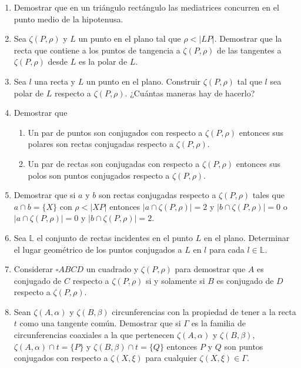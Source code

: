 \documentclass[12pt]{report}
\numberwithin{section}{chapter}
\begin{document}
\begin{enumerate}

\item Demostrar que en un triángulo rectángulo las mediatrices concurren en el punto medio de la hipotenusa.

\item Sea $\zeta(P, \rho)$ y $L$ un punto en el plano tal que $\rho < |LP|$. Demostrar que la recta que contiene a los puntos de tangencia a $\zeta(P,\rho)$ de las tangentes a $\zeta(P, \rho)$ desde $L$ es la polar de $L$. 

\item Sea $l$ una recta y $L$ un punto en el plano. Construir $\zeta(P, \rho)$ tal que $l$ sea polar de
$L$ respecto a $\zeta(P, \rho)$. ¿Cuántas maneras hay de hacerlo?

\item Demostrar que
\begin{enumerate}
\item Un par de puntos son conjugados con respecto a $\zeta(P, \rho)$ entonces sus polares son rectas conjugadas respecto a $\zeta(P, \rho)$.
\item Un par de rectas son conjugadas con respecto a $\zeta(P, \rho)$ entonces sus polos son puntos conjugados respecto a $\zeta(P, \rho)$.
\end{enumerate}

\item Demostrar que si $a$ y $b$ son rectas conjugadas respecto a $\zeta(P, \rho)$ tales que $a \cap b = \{X\}$ con $\rho < |XP|$ entonces $|a \cap \zeta(P, \rho)| = 2$ y $|b \cap \zeta(P, \rho)| = 0$ o $|a \cap \zeta(P, \rho)| = 0$ y $|b \cap \zeta(P, \rho)| = 2$.

\item Sea $\mathbb L$ el conjunto de rectas incidentes en el punto $L$ en el plano. Determinar el lugar geométrico de los puntos conjugados a $L$ en $l$ para cada $l \in \mathbb L$.

\item Considerar $\square ABCD$ un cuadrado y $\zeta(P, \rho)$ para demostrar que $A$ es conjugado de $C$ respecto a $\zeta(P, \rho)$ si y solamente si $B$ es conjugado de $D$ respecto a $\zeta(P, \rho)$.

\item Sean $\zeta(A, \alpha)$ y $ \zeta(B, \beta)$ circunferencias con la propiedad de tener a la recta $t$ como una tangente común. Demostrar que si $\Gamma$ es la familia de circunferencias coaxiales a la que pertenecen $\zeta(A, \alpha)$ y $ \zeta(B, \beta)$, $\zeta(A, \alpha) \cap t = \{P\}$ y $\zeta(B, \beta) \cap t = \{Q\}$ entonces $P$ y $Q$ son puntos conjugados con respecto a $\zeta(X, \xi)$ para cualquier $\zeta(X,\xi) \in \Gamma$.


\end{enumerate}
\end{document}
